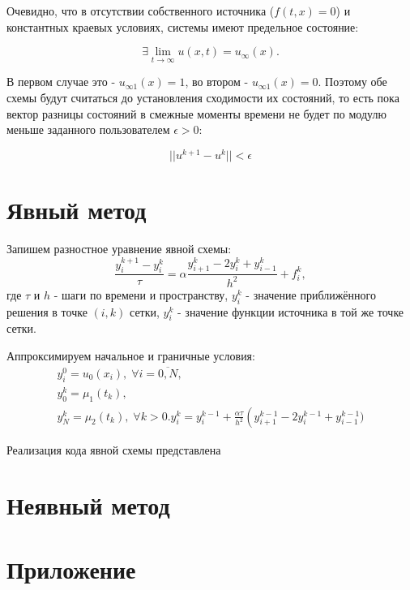 Очевидно, что в отсутствии собственного источника ($f(t,x) = 0$) и константных краевых условиях, системы имеют предельное состояние:

\[\exists \lim\limits_{t \rightarrow \infty} u(x, t) = u_\infty (x).\]

В первом случае это - $u_{\infty1} (x) = 1$, во втором - $u_{\infty1} (x) = 0$. 
Поэтому обе схемы будут считаться до установления сходимости их состояний,
то есть пока вектор разницы состояний в смежные моменты времени не будет по модулю меньше заданного пользователем $\epsilon > 0$:

\[ ||u^{k+1} - u^k|| < \epsilon \]

\section{Явный метод}

Запишем разностное уравнение явной схемы:
$$\dfrac{y_i^{k+1} - y_i^{k}}{\tau} = \alpha \dfrac{y_{i+1}^{k} - 2 y_i^{k} + y_{i-1}^{k}}{h^2} + f_i^k,$$
где $\tau$ и $h$ - шаги по времени и пространству, $y_i^k$ - значение приближённого решения в точке $(i, k)$ сетки, $y_i^k$ - значение функции источника в той же точке сетки. 

Аппроксимируем начальное и граничные условия:
$$
\begin{array}{l}
y_i^0 = u_0(x_i), \; \forall i = \overline{0, N},\\
y_0^k = \mu_1(t_k), \\
y_N^k = \mu_2(t_k), \; \forall k > 0.
y_i^k = y_i^{k-1} + \frac{\alpha \tau}{h^2} \left(y_{i+1}^{k-1} - 2 y_i^{k-1} + y_{i-1}^{k-1})
\end{array}$$

Реализация кода явной схемы представлена 

\section{Неявный метод}



\section{Приложение}


